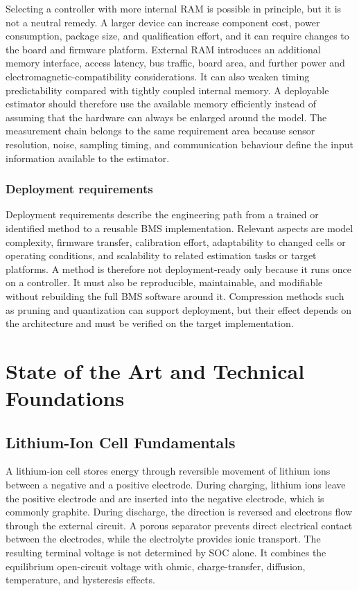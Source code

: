 \documentclass[
    a4paper,
    12pt,
    titlepage,
    bibliography=totoc,
    twoside=on,
    parskip=false,
    numbers=noenddot,
    cleardoublepage=empty,
    DIV=12,
    BCOR=12.0mm,
    headheight=36pt,
    headings=openright
]{scrreprt}
\begin{document}
Selecting a controller with more internal RAM is possible in principle, but it is not a neutral remedy. A larger device can increase component cost, power consumption, package size, and qualification effort, and it can require changes to the board and firmware platform. External RAM introduces an additional memory interface, access latency, bus traffic, board area, and further power and electromagnetic-compatibility considerations. It can also weaken timing predictability compared with tightly coupled internal memory. A deployable estimator should therefore use the available memory efficiently instead of assuming that the hardware can always be enlarged around the model. The measurement chain belongs to the same requirement area because sensor resolution, noise, sampling timing, and communication behaviour define the input information available to the estimator.

\subsection{Deployment requirements}
Deployment requirements describe the engineering path from a trained or identified method to a reusable BMS implementation. Relevant aspects are model complexity, firmware transfer, calibration effort, adaptability to changed cells or operating conditions, and scalability to related estimation tasks or target platforms. A method is therefore not deployment-ready only because it runs once on a controller. It must also be reproducible, maintainable, and modifiable without rebuilding the full BMS software around it. Compression methods such as pruning and quantization can support deployment, but their effect depends on the architecture and must be verified on the target implementation.\autocite{hanLearningBothWeights2015,jacobQuantizationTrainingNeural2017}

\chapter{State of the Art and Technical Foundations}
\label{chap:foundations}

\section{Lithium-Ion Cell Fundamentals}
A lithium-ion cell stores energy through reversible movement of lithium ions between a negative and a positive electrode. During charging, lithium ions leave the positive electrode and are inserted into the negative electrode, which is commonly graphite. During discharge, the direction is reversed and electrons flow through the external circuit. A porous separator prevents direct electrical contact between the electrodes, while the electrolyte provides ionic transport. The resulting terminal voltage is not determined by SOC alone. It combines the equilibrium open-circuit voltage with ohmic, charge-transfer, diffusion, temperature, and hysteresis effects.\autocite{kurzweilElektrochemischeSpeicherSuperkondensatoren2018,plettBatteryManagementSystems2015}
\end{document}
